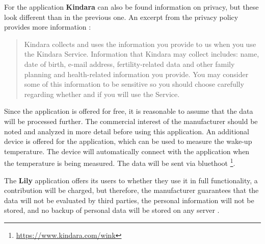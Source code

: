 For the application \textbf{Kindara} can also be found information on privacy, but these look different than in the previous one. An excerpt from the privacy policy provides more information \cite{kindara}:
\begin{quote}
	Kindara collects and uses the information you provide to us when you use the Kindara Service. Information that Kindara may collect includes: name, date of birth, e-mail address, fertility-related data and other family planning and health-related information you provide. You may consider some of this information to be sensitive so you should choose carefully regarding whether and if you will use the Service.
\end{quote}
Since the application is offered for free, it is reasonable to assume that the data will be processed further. The commercial interest of the manufacturer should be noted and analyzed in more detail before using this application.
An additional device is offered for the application, which can be used to measure the wake-up temperature. The device will automatically connect with the application when the temperature is being measured. The data will be sent via bluethoot \footnote{\url{https://www.kindara.com/wink}}.

The \textbf{Lily} application offers its users to whether they use it in full functionality, a contribution will be charged, but therefore, the manufacturer guarantees that the data will not be evaluated by third parties, the personal information will not be stored, and no backup of personal data will be stored on any server \cite{lily}.

